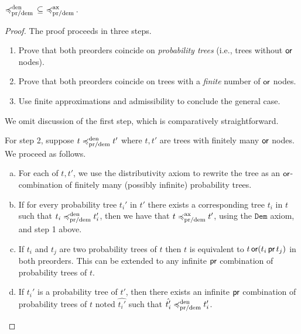 \begin{lemma}
${\preccurlyeq^{\text{den}}_{\text{pr/dem}}} \, \subseteq \, \, \preccurlyeq^{\text{ax}}_{\text{pr/dem}}\,$.
\end{lemma}
\begin{proof}
The proof proceeds in three steps.
    \begin{enumerate}
        \item Prove that both preorders coincide 
            on \emph{probability trees} (i.e., trees without $\operatorname{\textsf{or}}$ nodes).
        \item Prove that both preorders coincide 
            on trees with a \emph{finite} number 
            of $\operatorname{\textsf{or}}$ nodes.
        \item Use finite approximations and admissibility
            to conclude the general case.
    \end{enumerate}

We omit discussion of the first step, which  is comparatively straightforward.

For step 2, suppose $t \preccurlyeq^{\text{den}}_{\text{pr/dem}} t'$ where $t,t'$ are 
trees with finitely many $\operatorname{\textsf{or}}$ nodes. We proceed as follows.
    \begin{enumerate}[(a)]
        \item For each of $t, t'$, we use the distributivity axiom to rewrite the tree
          as an $\operatorname{\textsf{or}}$-combination of finitely many (possibly infinite) {probability trees}.

        \item 
            If for every 
            probability
            tree $t_i'$ in $t'$ there exists 
            a corresponding tree $t_i$ in $t$ 
            such that $t_i \preccurlyeq^{\text{den}}_{\text{pr/dem}} t_i'$,
            then we have that $t \preccurlyeq^{\text{ax}}_{\text{pr/dem}} t'$, using the $\texttt{Dem}$ axiom, and  step 1 above.

        \item 
            If $t_i$ and $t_j$ are two 
            probability trees of $t$ 
            then $t$ is equivalent to 
            $t \operatorname{\textsf{or}} (t_i \operatorname{\textsf{pr}} t_j)$ 
            in both preorders.
            This can be extended to any infinite 
            $\operatorname{\textsf{pr}}$ combination 
            of probability trees of $t$.

        \item 
            If $t_i'$ is a probability tree of $t'$,
            then there exists an infinite $\operatorname{\textsf{pr}}$
            combination of probability trees of $t$
            noted $\hat{t_i'}$
            such that $\hat{t_i'} \preccurlyeq^{\text{den}}_{\text{pr/dem}} t_i'$.



\end{enumerate}
\end{proof}
